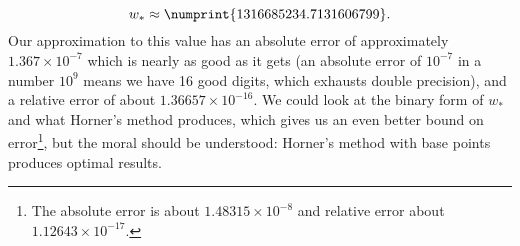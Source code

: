 \begin{ex}
\begin{equation}
    w_{*} \approx \numprint{1316685234.7131606799}.
  \end{equation}
  Our approximation to this value has an absolute error of approximately
  $1.367\times10^{-7}$ which is nearly as good as it gets (an absolute
  error of $10^{-7}$ in a number $10^{9}$ means we have 16 good digits,
  which exhausts double precision), and a relative error of about
  $1.36657\times10^{-16}$. We could look at the binary form of $w_{*}$
  and what Horner's method produces, which gives us an even better bound
  on error\footnote{The absolute error is about $1.48315\times 10^{-8}$ and
  relative error about $1.12643\times10^{-17}$.}, but the moral should be understood: Horner's method with
  base points produces optimal results.
\end{ex}
